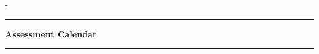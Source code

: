 

\usepackage[left=1in,right=1in,top=1in,bottom=1in,landscape]{geometry}
\usepackage{enumerate,amssymb}
\usepackage{termcal}

\newcommand{\RAT}[1]{\ifbool{TBL}{{\bf RAT Module #1}}{{\bf Review for Module #1}}\\}
\newcommand{\aday}[2]{{\bf Module #1 Part #2 \\}}
\newcommand{\quiz}[2]{{{\bf Quiz #1:} #2 \\}}


\pagestyle{empty}
\noindent \course-\courseSection \hfill \sem \hfill \prof
\vspace{0.3in}
\hrule
\begin{center}{\large \bf Assessment Calendar}\end{center}
\hrule



